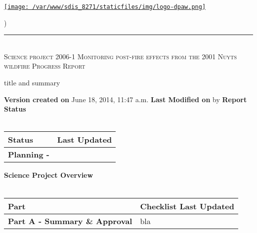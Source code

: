 \documentclass[version=last, paper=a4, DIV=18, usenames, dvipsnames]{scrartcl}
\newcommand{\HRule}{\rule{\linewidth}{0.1pt}}
\begin{document}
\setcounter{secnumdepth}{-1}


\begin{titlepage}
\begin{center}
\begin{minipage}[t]{0.28\textwidth}
\begin{flushleft}
\href{http://www.dpaw.wa.gov.au}{\texttt{[image: /var/www/sdis\_8271/staticfiles/img/logo-dpaw.png]}}
\end{flushleft}
\end{minipage}
\begin{minipage}[b]{0.7\textwidth}
\begin{flushright}
    \href{http://sdis.dpaw.wa.gov.au/documents/progressreport/1210/download/}{}) \\
\end{flushright}
\end{minipage}
\HRule \\[0.4cm]
\vfill
\textsc{\Huge Science project 2006-1 Monitoring post-fire effects from the 2001 Nuyts wildfire \newline }
\vfill
\textsc{\Huge Progress Report}

\vfill\vfill\vfill\vfill
title and summary

\vfill\vfill\vfill\vfill\vfill\vfill\vfill\vfill

\textbf{Version created on} June 18, 2014, 11:47 a.m.
\vfill
\textbf{Last Modified on}  by 
\vfill\vfill
\textbf{Report Status}\\\,
\begin{tabu} to \linewidth { | X[l] | X | }
\hline
{}
Status & Last Updated \\
\hline
\textbf{Planning - } \\
\hline
\end{tabu}
\vfill
\textbf{Science Project Overview}\\\,
\begin{tabu} to \linewidth { | X[l] | X | }
\hline
{}
Part & Checklist Last Updated \\
\hline
\textbf{Part A - Summary \& Approval} & bla \\
\hline
\end{tabu}

\end{center}
\end{titlepage}

\setcounter{tocdepth}{2}
\tableofcontents
\clearpage
\end{document}
